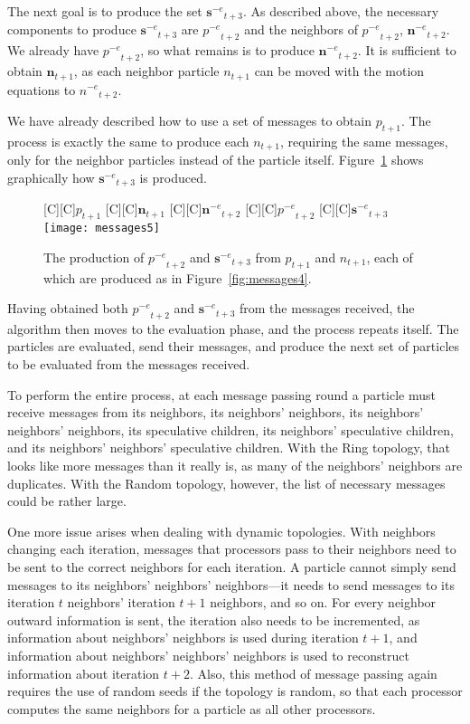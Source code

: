 \documentclass[smallcondensed]{svjour3}
\newcommand{\fig}[1]{Figure~\ref{fig:#1}}
\providecommand{\noeval}[1]{\ensuremath{#1^{-e}}}
\providecommand{\p}{\ensuremath{p}}
\providecommand{\sset}{\ensuremath{\mathbf{s}}}
\providecommand{\n}{\ensuremath{n}}
\providecommand{\nset}{\ensuremath{\mathbf{n}}}
\begin{document}
The next goal is to produce the set $\noeval{\sset}_{t+3}$.  As described
above, the necessary components to produce $\noeval{\sset}_{t+3}$ are
$\noeval{\p}_{t+2}$ and the neighbors of $\noeval{\p}_{t+2}$,
$\noeval{\nset}_{t+2}$.  We already have $\noeval{\p}_{t+2}$, so what remains
is to produce $\noeval{\nset}_{t+2}$.  It is sufficient to obtain
$\nset_{t+1}$, as each neighbor particle $\n_{t+1}$ can be moved with the
motion equations to $\noeval{\n}_{t+2}$.

We have already described how to use a set of messages to obtain $\p_{t+1}$.
The process is exactly the same to produce each $\n_{t+1}$, requiring the same
messages, only for the neighbor particles instead of the particle itself.
\fig{messages5} shows graphically how $\noeval{\sset}_{t+3}$ is produced.

\begin{figure}
  \centering
  [C][C]{$\p_{t+1}$}
  [C][C]{$\nset_{t+1}$}
  [C][C]{$\noeval{\nset}_{t+2}$}
  [C][C]{$\noeval{\p}_{t+2}$}
  [C][C]{$\noeval{\sset}_{t+3}$}
  \texttt{[image: messages5]}
  \caption{The production of $\noeval{\p}_{t+2}$ and $\noeval{\sset}_{t+3}$
  from $\p_{t+1}$ and $\n_{t+1}$, each of which are produced as in
  \fig{messages4}.}
  \label{fig:messages5}
\end{figure}

Having obtained both $\noeval{\p}_{t+2}$ and $\noeval{\sset}_{t+3}$ from the
messages received, the algorithm then moves to the evaluation phase, and the
process repeats itself.  The particles are evaluated, send their messages, and
produce the next set of particles to be evaluated from the messages received.

To perform the entire process, at each message passing round a particle must
receive messages from its neighbors, its neighbors' neighbors, its neighbors'
neighbors' neighbors, its speculative children, its neighbors' speculative
children, and its neighbors' neighbors' speculative children.  With the Ring
topology, that looks like more messages than it really is, as many of the
neighbors' neighbors are duplicates.  With the Random topology, however, the
list of necessary messages could be rather large.  

One more issue arises when dealing with dynamic topologies.  With neighbors
changing each iteration, messages that processors pass to their neighbors need
to be sent to the correct neighbors for each iteration.  A particle cannot
simply send messages to its neighbors' neighbors' neighbors---it needs to send
messages to its iteration $t$ neighbors' iteration $t+1$ neighbors, and so on.
For every neighbor outward information is sent, the iteration also needs to be
incremented, as information about neighbors' neighbors is used during iteration
$t+1$, and information about neighbors' neighbors' neighbors is used to
reconstruct information about iteration $t+2$.  Also, this method of message
passing again requires the use of random seeds if the topology is random, so
that each processor computes the same neighbors for a particle as all other
processors.
\end{document}
